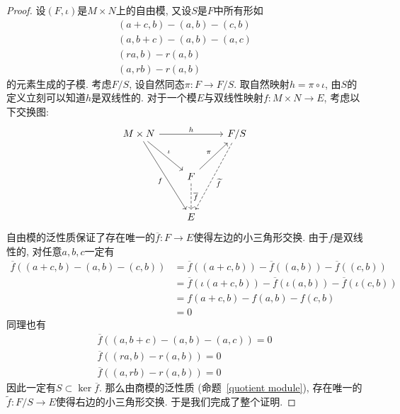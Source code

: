 \begin{proof}
    设$(F,\iota)$是$M\times N$上的自由模, 又设$S$是$F$中所有形如
    \begin{gather*}
        (a+c,b)-(a,b)-(c,b)\\
        (a,b+c)-(a,b)-(a,c)\\
        (ra,b)-r(a,b)\\
        (a,rb)-r(a,b)
    \end{gather*}
    的元素生成的子模.
    考虑$F/S$, 设自然同态$\pi:F\to F/S$.
    取自然映射$h=\pi\circ\iota$, 由$S$的定义立刻可以知道$h$是双线性的.
    对于一个模$E$与双线性映射$f:M\times N\to E$, 考虑以下交换图:
    \[\begin{tikzcd}[row sep=large]
        M\times N \arrow[dr, "\iota"] \arrow[ddr, "f"'] \arrow[rr, "h"] &  & F/S \arrow[ddl, dashed, "\widetilde{f}"]\\
        & F \arrow[ur, "\pi"] \arrow[d, dashed, "\overline{f}"] & \\
        & E &
    \end{tikzcd}\]
    自由模的泛性质保证了存在唯一的$\overline{f}:F\to E$使得左边的小三角形交换.
    由于$f$是双线性的, 对任意$a,b,c$一定有
    \begin{align*}
        \overline{f}((a+c,b)-(a,b)-(c,b))&=\overline{f}((a+c,b))-\overline{f}((a,b))-\overline{f}((c,b))\\
        &=\overline{f}(\iota(a+c,b))-\overline{f}(\iota(a,b))-\overline{f}(\iota(c,b))\\
        &=f(a+c,b)-f(a,b)-f(c,b)\\
        &=0
    \end{align*}
    同理也有
    \begin{gather*}
        \overline{f}((a,b+c)-(a,b)-(a,c))=0\\
        \overline{f}((ra,b)-r(a,b))=0\\
        \overline{f}((a,rb)-r(a,b))=0
    \end{gather*}
    因此一定有$S\subset\ker{\overline{f}}$.
    那么由商模的泛性质 (命题~\ref{quotient module}), 存在唯一的$\widetilde{f}:F/S\to E$使得右边的小三角形交换.
    于是我们完成了整个证明.
\end{proof}

